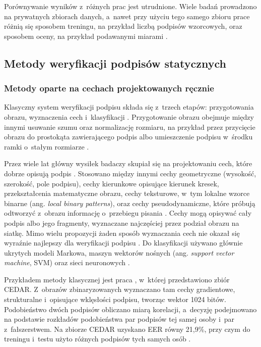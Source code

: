 \documentclass[12pt, twoside, openright]{article}
\begin{document}
Porównywanie wyników z~różnych prac jest utrudnione.
Wiele badań prowadzono na prywatnych zbiorach danych, a~nawet przy użyciu tego samego zbioru prace różnią się sposobem treningu, na przykład liczbą podpisów wzorcowych, oraz sposobem oceny, na przykład podawanymi miarami \cite{hafemann2017review}.

\subsection{Metody weryfikacji podpisów statycznych}
\label{Subsec:metody}

\subsubsection*{Metody oparte na cechach projektowanych ręcznie}

Klasyczny system weryfikacji podpisu składa się z~trzech etapów: przygotowania obrazu, wyznaczenia cech i~klasyfikacji \cite{hafemann2017review}.
Przygotowanie obrazu obejmuje między innymi usuwanie szumu oraz normalizację rozmiaru, na przykład przez przycięcie obrazu do prostokąta zawierającego podpis albo umieszczenie podpisu w~środku ramki o~stałym rozmiarze \cite{hafemann2017review}.

Przez wiele lat główny wysiłek badaczy skupiał się na projektowaniu cech, które dobrze opisują podpis \cite{hafemann2017review}.
Stosowano między innymi cechy geometryczne (wysokość, szerokość, pole podpisu), cechy kierunkowe opisujące kierunek kresek, przekształcenia matematyczne obrazu, cechy teksturowe, w~tym lokalne wzorce binarne (ang. \textit{local binary patterns}), oraz cechy pseudodynamiczne, które próbują odtworzyć z~obrazu informację o~przebiegu pisania \cite{hafemann2017review}.
Cechy mogą opisywać cały podpis albo jego fragmenty, wyznaczane najczęściej przez podział obrazu na siatkę.
Mimo wielu propozycji żaden sposób wyznaczania cech nie okazał się wyraźnie najlepszy dla weryfikacji podpisu \cite{hafemann2017features}.
Do klasyfikacji używano głównie ukrytych modeli Markowa, maszyn wektorów nośnych (ang. \textit{support vector machine}, SVM) oraz sieci neuronowych \cite{hafemann2017review}.

Przykładem metody klasycznej jest praca \cite{kalera2004}, w~której przedstawiono zbiór CEDAR.
Z~obrazów zbinaryzowanych wyznaczano tam cechy gradientowe, strukturalne i~opisujące wklęsłości podpisu, tworząc wektor 1024 bitów.
Podobieństwo dwóch podpisów obliczano miarą korelacji, a~decyzję podejmowano na podstawie rozkładów podobieństwa par podpisów tej samej osoby i~par z~fałszerstwem.
Na zbiorze CEDAR uzyskano EER równy 21,9\%, przy czym do treningu i~testu użyto różnych podpisów tych samych osób \cite{kalera2004}.
\end{document}
